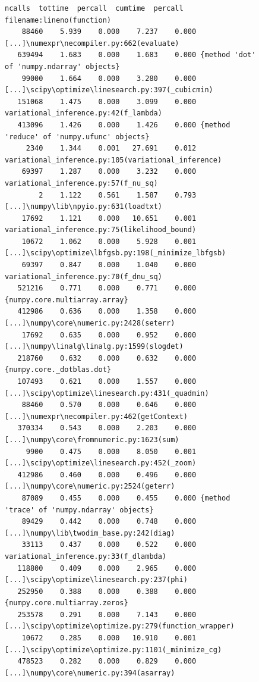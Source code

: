 \documentclass[12pt,a4paper,twoside,openright]{report}
\begin{document}
\begin{figure}
\begin{Verbatim}[fontsize=\scriptsize]
   ncalls  tottime  percall  cumtime  percall filename:lineno(function)
    88460    5.939    0.000    7.237    0.000 [...]\numexpr\necompiler.py:662(evaluate)
   639494    1.683    0.000    1.683    0.000 {method 'dot' of 'numpy.ndarray' objects}
    99000    1.664    0.000    3.280    0.000 [...]\scipy\optimize\linesearch.py:397(_cubicmin)
   151068    1.475    0.000    3.099    0.000 variational_inference.py:42(f_lambda)
   413096    1.426    0.000    1.426    0.000 {method 'reduce' of 'numpy.ufunc' objects}
     2340    1.344    0.001   27.691    0.012 variational_inference.py:105(variational_inference)
    69397    1.287    0.000    3.232    0.000 variational_inference.py:57(f_nu_sq)
        2    1.122    0.561    1.587    0.793 [...]\numpy\lib\npyio.py:631(loadtxt)
    17692    1.121    0.000   10.651    0.001 variational_inference.py:75(likelihood_bound)
    10672    1.062    0.000    5.928    0.001 [...]\scipy\optimize\lbfgsb.py:198(_minimize_lbfgsb)
    69397    0.847    0.000    1.040    0.000 variational_inference.py:70(f_dnu_sq)
   521216    0.771    0.000    0.771    0.000 {numpy.core.multiarray.array}
   412986    0.636    0.000    1.358    0.000 [...]\numpy\core\numeric.py:2428(seterr)
    17692    0.635    0.000    0.952    0.000 [...]\numpy\linalg\linalg.py:1599(slogdet)
   218760    0.632    0.000    0.632    0.000 {numpy.core._dotblas.dot}
   107493    0.621    0.000    1.557    0.000 [...]\scipy\optimize\linesearch.py:431(_quadmin)
    88460    0.570    0.000    0.646    0.000 [...]\numexpr\necompiler.py:462(getContext)
   370334    0.543    0.000    2.203    0.000 [...]\numpy\core\fromnumeric.py:1623(sum)
     9900    0.475    0.000    8.050    0.001 [...]\scipy\optimize\linesearch.py:452(_zoom)
   412986    0.460    0.000    0.496    0.000 [...]\numpy\core\numeric.py:2524(geterr)
    87089    0.455    0.000    0.455    0.000 {method 'trace' of 'numpy.ndarray' objects}
    89429    0.442    0.000    0.748    0.000 [...]\numpy\lib\twodim_base.py:242(diag)
    33113    0.437    0.000    0.522    0.000 variational_inference.py:33(f_dlambda)
   118800    0.409    0.000    2.965    0.000 [...]\scipy\optimize\linesearch.py:237(phi)
   252950    0.388    0.000    0.388    0.000 {numpy.core.multiarray.zeros}
   253578    0.291    0.000    7.143    0.000 [...]\scipy\optimize\optimize.py:279(function_wrapper)
    10672    0.285    0.000   10.910    0.001 [...]\scipy\optimize\optimize.py:1101(_minimize_cg)
   478523    0.282    0.000    0.829    0.000 [...]\numpy\core\numeric.py:394(asarray)

\end{Verbatim}
\end{figure}
\end{document}
